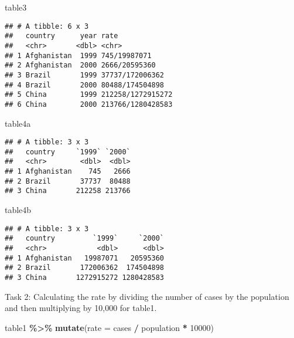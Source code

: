 \documentclass[
]{article}
\newenvironment{Shaded}{\begin{snugshade}}{\end{snugshade}}
\newcommand{\AttributeTok}[1]{\textcolor[rgb]{0.13,0.29,0.53}{#1}}
\newcommand{\DecValTok}[1]{\textcolor[rgb]{0.00,0.00,0.81}{#1}}
\newcommand{\FunctionTok}[1]{\textcolor[rgb]{0.13,0.29,0.53}{\textbf{#1}}}
\newcommand{\NormalTok}[1]{#1}
\newcommand{\SpecialCharTok}[1]{\textcolor[rgb]{0.81,0.36,0.00}{\textbf{#1}}}
\begin{document}
\begin{Shaded}
\begin{Highlighting}[]
\NormalTok{table3}
\end{Highlighting}
\end{Shaded}

\begin{verbatim}
## # A tibble: 6 x 3
##   country      year rate             
##   <chr>       <dbl> <chr>            
## 1 Afghanistan  1999 745/19987071     
## 2 Afghanistan  2000 2666/20595360    
## 3 Brazil       1999 37737/172006362  
## 4 Brazil       2000 80488/174504898  
## 5 China        1999 212258/1272915272
## 6 China        2000 213766/1280428583
\end{verbatim}

\begin{Shaded}
\begin{Highlighting}[]
\NormalTok{table4a}
\end{Highlighting}
\end{Shaded}

\begin{verbatim}
## # A tibble: 3 x 3
##   country     `1999` `2000`
##   <chr>        <dbl>  <dbl>
## 1 Afghanistan    745   2666
## 2 Brazil       37737  80488
## 3 China       212258 213766
\end{verbatim}

\begin{Shaded}
\begin{Highlighting}[]
\NormalTok{table4b}
\end{Highlighting}
\end{Shaded}

\begin{verbatim}
## # A tibble: 3 x 3
##   country         `1999`     `2000`
##   <chr>            <dbl>      <dbl>
## 1 Afghanistan   19987071   20595360
## 2 Brazil       172006362  174504898
## 3 China       1272915272 1280428583
\end{verbatim}

Task 2: Calculating the rate by dividing the number of cases by the
population and then multiplying by 10,000 for table1.

\begin{Shaded}
\begin{Highlighting}[]
\NormalTok{table1 }\SpecialCharTok{\%\textgreater{}\%} 
  \FunctionTok{mutate}\NormalTok{(}\AttributeTok{rate =}\NormalTok{ cases }\SpecialCharTok{/}\NormalTok{ population }\SpecialCharTok{*} \DecValTok{10000}\NormalTok{)}
\end{Highlighting}
\end{Shaded}
\end{document}
